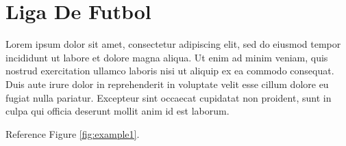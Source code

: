 \documentclass{article}
\begin{document}
\section{Liga De Futbol}

Lorem ipsum dolor sit amet, consectetur adipiscing elit, sed do eiusmod tempor incididunt ut labore et dolore magna aliqua. Ut enim ad minim veniam, quis nostrud exercitation ullamco laboris nisi ut aliquip ex ea commodo consequat. Duis aute irure dolor in reprehenderit in voluptate velit esse cillum dolore eu fugiat nulla pariatur. Excepteur sint occaecat cupidatat non proident, sunt in culpa qui officia deserunt mollit anim id est laborum.


Reference Figure \ref{fig:example1}.

\cite{oracle2024}
\cite{sqlserver2022}

\end{document}
